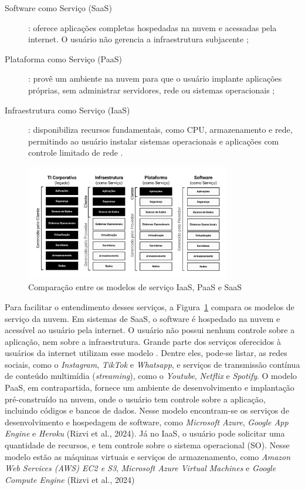 \begin{description}
    \item[Software como Serviço (SaaS)]: oferece aplicações completas hospedadas na nuvem e acessadas pela internet. O usuário não gerencia a infraestrutura subjacente \cite{mell2011};
    \item[Plataforma como Serviço (PaaS)]: provê um ambiente na nuvem para que o usuário implante aplicações próprias, sem administrar servidores, rede ou sistemas operacionais \cite{mell2011};
    \item[Infraestrutura como Serviço (IaaS)]: disponibiliza recursos fundamentais, como CPU, armazenamento e rede, permitindo ao usuário instalar sistemas operacionais e aplicações com controle limitado de rede \cite{mell2011}.
\end{description}

\begin{figure}[H]
\centering
\includegraphics[width=0.8\textwidth]{figuras/Figura 1 - Comparação entre os modelos de serviço.png}
\caption{Comparação entre os modelos de serviço IaaS, PaaS e SaaS}
\label{fig:modelos-servico}
\end{figure}

Para facilitar o entendimento desses serviços, a Figura~\ref{fig:modelos-servico} compara os modelos de serviço da nuvem. Em sistemas de SaaS, o software é hospedado na nuvem e acessível ao usuário pela internet. O usuário não possui nenhum controle sobre a aplicação, nem sobre a infraestrutura. Grande parte dos serviços oferecidos à usuários da internet utilizam esse modelo \cite{rizvi2024}. Dentre eles, pode-se listar, as redes sociais, como o \textit{Instagram}, \textit{TikTok} e \textit{Whatsapp}, e serviços de transmissão contínua de conteúdo multimídia (\textit{streaming}), como o \textit{Youtube}, \textit{Netflix} e \textit{Spotify}. O modelo PaaS, em contrapartida, fornece um ambiente de desenvolvimento e implantação pré-construído na nuvem, onde o usuário tem controle sobre a aplicação, incluindo códigos e bancos de dados. Nesse modelo encontram-se os serviços de desenvolvimento e hospedagem de software, como \textit{Microsoft Azure}, \textit{Google App Engine} e \textit{Heroku} (Rizvi et al., 2024). Já no IaaS, o usuário pode solicitar uma quantidade de recursos, e tem controle sobre o sistema operacional (SO). Nesse modelo estão as máquinas virtuais e serviços de armazenamento, como  \textit{Amazon Web Services (AWS) EC2 e S3},  \textit{Microsoft Azure Virtual Machines} e  \textit{Google Compute Engine}  (Rizvi et al., 2024)

